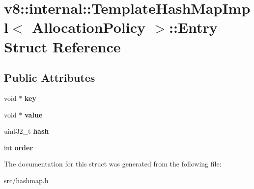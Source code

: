 \hypertarget{structv8_1_1internal_1_1_template_hash_map_impl_1_1_entry}{}\section{v8\+:\+:internal\+:\+:Template\+Hash\+Map\+Impl$<$ Allocation\+Policy $>$\+:\+:Entry Struct Reference}
\label{structv8_1_1internal_1_1_template_hash_map_impl_1_1_entry}
\subsection*{Public Attributes}
\begin{DoxyCompactItemize}
\item 
\hypertarget{structv8_1_1internal_1_1_template_hash_map_impl_1_1_entry_ac1ea76644b61f79e68ecb194304ee061}{}void $\ast$ {\bfseries key}\label{structv8_1_1internal_1_1_template_hash_map_impl_1_1_entry_ac1ea76644b61f79e68ecb194304ee061}

\item 
\hypertarget{structv8_1_1internal_1_1_template_hash_map_impl_1_1_entry_ace4064a198d7ff4973271b4f55760cef}{}void $\ast$ {\bfseries value}\label{structv8_1_1internal_1_1_template_hash_map_impl_1_1_entry_ace4064a198d7ff4973271b4f55760cef}

\item 
\hypertarget{structv8_1_1internal_1_1_template_hash_map_impl_1_1_entry_a91e5f43b7e0ad093500c9bfb440e918e}{}uint32\+\_\+t {\bfseries hash}\label{structv8_1_1internal_1_1_template_hash_map_impl_1_1_entry_a91e5f43b7e0ad093500c9bfb440e918e}

\item 
\hypertarget{structv8_1_1internal_1_1_template_hash_map_impl_1_1_entry_aa5e8b361e3c5d19caceda476f1f8f1d4}{}int {\bfseries order}\label{structv8_1_1internal_1_1_template_hash_map_impl_1_1_entry_aa5e8b361e3c5d19caceda476f1f8f1d4}

\end{DoxyCompactItemize}


The documentation for this struct was generated from the following file\+:\begin{DoxyCompactItemize}
\item 
src/hashmap.\+h\end{DoxyCompactItemize}
